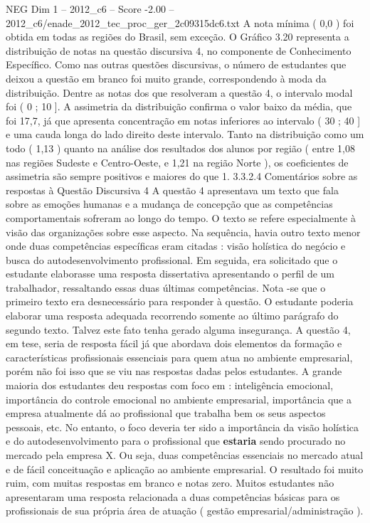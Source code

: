 \begin{textsample}{NEG Dim 1 – 2012\_c6 – Score -2.00 – 2012\_c6/enade\_2012\_tec\_proc\_ger\_2c09315dc6.txt}
A nota mínima ( 0,0 ) foi obtida em todas as regiões do Brasil, sem exceção.
O Gráfico 3.20 representa a distribuição de notas na questão discursiva 4, no componente de Conhecimento Específico.
Como nas outras questões discursivas, o número de estudantes que deixou a questão em branco foi muito grande, correspondendo à moda da distribuição.
Dentre as notas dos que resolveram a questão 4, o intervalo modal foi ( 0 ; 10 ].
A assimetria da distribuição confirma o valor baixo da média, que foi 17,7, já que apresenta concentração em notas inferiores ao intervalo ( 30 ; 40 ] e uma cauda longa do lado direito deste intervalo.
Tanto na distribuição como um todo ( 1,13 ) quanto na análise dos resultados dos alunos por região ( entre 1,08 nas regiões Sudeste e Centro-Oeste, e 1,21 na região Norte ), os coeficientes de assimetria são sempre positivos e maiores do que 1. 3.3.2.4 Comentários sobre as respostas à Questão Discursiva 4 A questão 4 apresentava um texto que fala sobre as emoções humanas e a mudança de concepção que as competências comportamentais sofreram ao longo do tempo.
O texto se refere especialmente à visão das organizações sobre esse aspecto.
Na sequência, havia outro texto menor onde duas competências específicas eram citadas : visão holística do negócio e busca do autodesenvolvimento profissional.
Em seguida, era solicitado que o estudante elaborasse uma resposta dissertativa apresentando o perfil de um trabalhador, ressaltando essas duas últimas competências.
Nota -se que o primeiro texto era desnecessário para responder à questão.
O estudante poderia elaborar uma resposta adequada recorrendo somente ao último parágrafo do segundo texto.
Talvez este fato tenha gerado alguma insegurança.
A questão 4, em tese, seria de resposta fácil já que abordava dois elementos da formação e características profissionais essenciais para quem atua no ambiente empresarial, porém não foi isso que se viu nas respostas dadas pelos estudantes.
A grande maioria dos estudantes deu respostas com foco em : inteligência emocional, importância do controle emocional no ambiente empresarial, importância que a empresa atualmente dá ao profissional que trabalha bem os seus aspectos pessoais, etc.
No entanto, o foco deveria ter sido a importância da visão holística e do autodesenvolvimento para o profissional que \textbf{estaria} sendo procurado no mercado pela empresa X.
Ou seja, duas competências essenciais no mercado atual e de fácil conceituação e aplicação ao ambiente empresarial.
O resultado foi muito ruim, com muitas respostas em branco e notas zero.
Muitos estudantes não apresentaram uma resposta relacionada a duas competências básicas para os profissionais de sua própria área de atuação ( gestão empresarial/administração ).

\end{textsample}
